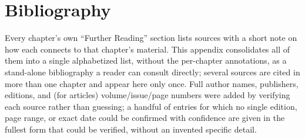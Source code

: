 \documentclass{book}
\begin{document}




\backmatter

\clearpage
{}
\chapter*{Bibliography}

Every chapter's own ``Further Reading'' section lists sources with a short note on how each connects to that chapter's material. This appendix consolidates all of them into a single alphabetized list, without the per-chapter annotations, as a stand-alone bibliography a reader can consult directly; several sources are cited in more than one chapter and appear here only once. Full author names, publishers, editions, and (for articles) volume/issue/page numbers were added by verifying each source rather than guessing; a handful of entries for which no single edition, page range, or exact date could be confirmed with confidence are given in the fullest form that could be verified, without an invented specific detail.
\end{document}
